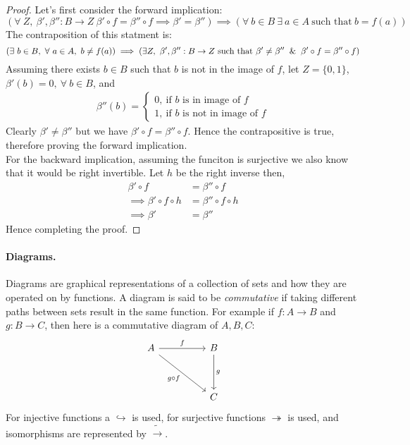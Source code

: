 \begin{proof}
  Let's first consider the forward implication:
  \[(\forall\ Z,\ \beta',\beta'':B\to Z\ \beta'\circ f = \beta''\circ f \implies \beta'=\beta'') \implies (\forall\ b\in B\ \exists\ a\in A\ \text{such that}\ b=f(a))\]
  The contraposition of this statment is:
  \[(\exists\ b\in B,\ \forall\ a\in A,\ b\neq f(a)) \implies (\exists Z,\ \beta',\beta'':B\to Z\ \text{such that}\ \beta'\neq\beta'' \And \beta'\circ f = \beta''\circ f )\]
  Assuming there exists $b\in B$ such that $b$ is not in the image of $f$, let $Z = \{0,1\}$, $\beta'(b) = 0,\ \forall\ b\in B$, and
  \begin{align*}
    \beta''(b) = \begin{cases}
      0,\ \text{if $b$ is in image of $f$}\\
      1,\ \text{if $b$ is not in image of $f$}
    \end{cases}
  \end{align*}
  Clearly $\beta' \neq \beta''$ but we have $\beta'\circ f = \beta''\circ f$. Hence the contrapositive is true, therefore proving the forward implication.\\

  For the backward implication, assuming the funciton is surjective we also know that it would be right invertible. Let $h$ be the right inverse then, 
  \begin{align*}
    \beta'\circ f &= \beta''\circ f\\
    \implies \beta'\circ f\circ h &= \beta'' \circ f \circ h\\
    \implies \beta' &= \beta''
  \end{align*}
  Hence completing the proof. 
\end{proof}
\paragraph{Diagrams.} Diagrams are graphical representations of a collection of sets and how they are operated on by functions. A diagram is said to be \textit{commutative} if taking different paths between sets result in the same function. For example if $f:A\to B$ and $g:B\to C$, then here is a commutative diagram of $A,B,C$:
\[
  \begin{tikzcd}[sep=huge]
    A \arrow{r}{f} \arrow[swap]{dr}{g\circ f} & B \arrow{d}{g}\\ & C 
  \end{tikzcd}
\]
For injective functions a $\hookrightarrow$ is used, for surjective functions $\twoheadrightarrow$ is used, and isomorphisms are represented by $\tilde{\rightarrow}$.
